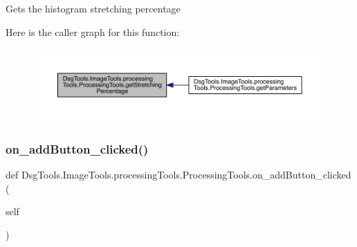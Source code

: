 \begin{DoxyVerb}Gets the histogram stretching percentage
\end{DoxyVerb}
 Here is the caller graph for this function\+:
\nopagebreak
\begin{figure}[H]
\begin{center}
\leavevmode
\includegraphics[width=350pt]{class_dsg_tools_1_1_image_tools_1_1processing_tools_1_1_processing_tools_a8e44625823c548a4773b69fa21f6a3fe_icgraph}
\end{center}
\end{figure}
\mbox{\label{class_dsg_tools_1_1_image_tools_1_1processing_tools_1_1_processing_tools_a375edc578937df2680546fcc63a15c9d}} 
\subsubsection{\texorpdfstring{on\+\_\+add\+Button\+\_\+clicked()}{on\_addButton\_clicked()}}
{\footnotesize\ttfamily def Dsg\+Tools.\+Image\+Tools.\+processing\+Tools.\+Processing\+Tools.\+on\+\_\+add\+Button\+\_\+clicked (\begin{DoxyParamCaption}\item[{}]{self }\end{DoxyParamCaption})}


